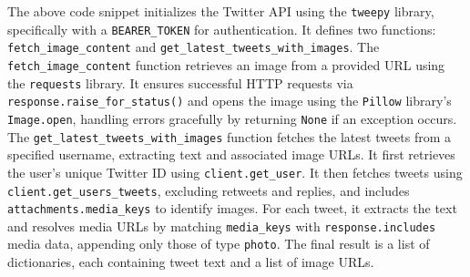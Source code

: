 \noindent 
The above code snippet initializes the Twitter API using the \texttt{tweepy} library, specifically with a \texttt{BEARER\_TOKEN} for authentication. It defines two functions: \texttt{fetch\_image\_content} and \texttt{get\_latest\_tweets\_with\_images}. The \texttt{fetch\_image\_content} function retrieves an image from a provided URL using the \texttt{requests} library. It ensures successful HTTP requests via \texttt{response.raise\_for\_status()} and opens the image using the \texttt{Pillow} library's \texttt{Image.open}, handling errors gracefully by returning \texttt{None} if an exception occurs. The \texttt{get\_latest\_tweets\_with\_images} function fetches the latest tweets from a specified username, extracting text and associated image URLs. It first retrieves the user's unique Twitter ID using \texttt{client.get\_user}. It then fetches tweets using \texttt{client.get\_users\_tweets}, excluding retweets and replies, and includes \texttt{attachments.media\_keys} to identify images. For each tweet, it extracts the text and resolves media URLs by matching \texttt{media\_keys} with \texttt{response.includes} media data, appending only those of type \texttt{photo}. The final result is a list of dictionaries, each containing tweet text and a list of image URLs.


